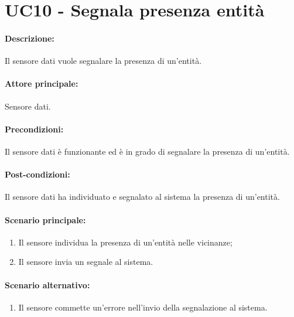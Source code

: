 \section{UC10 - Segnala presenza entità}

\paragraph{Descrizione:}
Il sensore dati vuole segnalare la presenza di un'entità.

\paragraph{Attore principale:}
Sensore dati.

\paragraph{Precondizioni:}
Il sensore dati è funzionante ed è in grado di segnalare la presenza di un'entità.

\paragraph{Post-condizioni:}
Il sensore dati ha individuato e segnalato al sistema la presenza di un'entità.

\paragraph{Scenario principale:}
\begin{enumerate}
    \item Il sensore individua la presenza di un'entità nelle vicinanze;
    \item Il sensore invia un segnale al sistema.
\end{enumerate}

\paragraph{Scenario alternativo:}
\begin{enumerate}
    \item Il sensore commette un'errore nell'invio della segnalazione al sistema.
\end{enumerate}